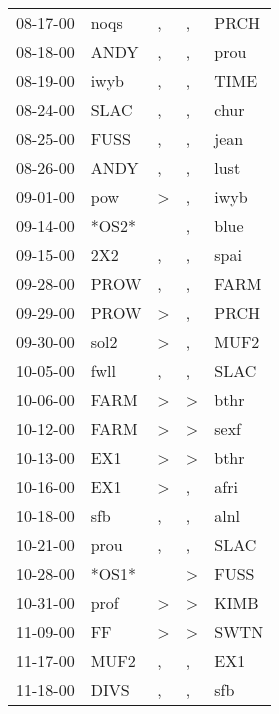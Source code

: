 \begin{supertabular}{lllll}
 08-17-00 &   noqs &                , &                , &   PRCH \\
 08-18-00 &   ANDY &                , &                , &   prou \\
 08-19-00 &   iwyb &                , &                , &   TIME \\
 08-24-00 &   SLAC &                , &                , &   chur \\
 08-25-00 &   FUSS &                , &                , &   jean \\
 08-26-00 &   ANDY &                , &                , &   lust \\
 09-01-00 &    pow &     \textgreater &                , &   iwyb \\
 09-14-00 &  *OS2* &                  &                , &   blue \\
 09-15-00 &    2X2 &                , &                , &   spai \\
 09-28-00 &   PROW &                , &                , &   FARM \\
 09-29-00 &   PROW &     \textgreater &                , &   PRCH \\
 09-30-00 &   sol2 &     \textgreater &                , &   MUF2 \\
 10-05-00 &   fwll &                , &                , &   SLAC \\
 10-06-00 &   FARM &     \textgreater &     \textgreater &   bthr \\
 10-12-00 &   FARM &     \textgreater &     \textgreater &   sexf \\
 10-13-00 &    EX1 &     \textgreater &     \textgreater &   bthr \\
 10-16-00 &    EX1 &     \textgreater &                , &   afri \\
 10-18-00 &    sfb &                , &                , &   alnl \\
 10-21-00 &   prou &                , &                , &   SLAC \\
 10-28-00 &  *OS1* &                  &     \textgreater &   FUSS \\
 10-31-00 &   prof &     \textgreater &     \textgreater &   KIMB \\
 11-09-00 &     FF &     \textgreater &     \textgreater &   SWTN \\
 11-17-00 &   MUF2 &                , &                , &    EX1 \\
 11-18-00 &   DIVS &                , &                , &    sfb \\

\end{supertabular}
